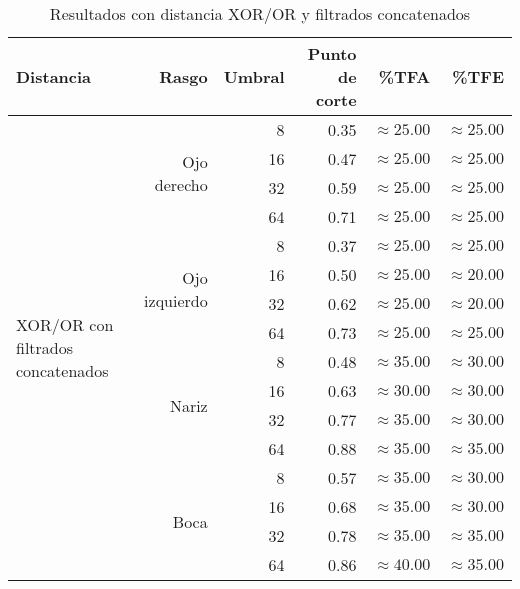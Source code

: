 \begin{table}
\begin{tabular}{|l|r|r|r|r|r|}
 \hline
  Distancia & Rasgo & Umbral & Punto de corte & \%TFA  & \%TFE \\
  \hline \hline
  \multirow{16}{*}{XOR/OR con filtrados concatenados}
& \multirow{4}{*}{Ojo derecho} & 8  & 0.35 & $\approx 25.00$ & $\approx 25.00$ \\
& & 16 & 0.47 & $\approx 25.00$ & $\approx 25.00$ \\
& & 32 & 0.59 & $\approx 25.00$ & $\approx 25.00$ \\
& & 64 & 0.71 & $\approx 25.00$ & $\approx 25.00$ \\ \cline{2-6}

& \multirow{4}{*}{Ojo izquierdo} & 8  & 0.37 & $\approx 25.00$ & $\approx 25.00$ \\
& & 16 & 0.50 & $\approx 25.00$ & $\approx 20.00$ \\
& & 32 & 0.62 & $\approx 25.00$ & $\approx 20.00$ \\
& & 64 & 0.73 & $\approx 25.00$ & $\approx 25.00$ \\ \cline{2-6}

& \multirow{4}{*}{Nariz} & 8  & 0.48 & $\approx 35.00$ & $\approx 30.00$ \\
& & 16 & 0.63 & $\approx 30.00$ & $\approx 30.00$ \\
& & 32 & 0.77 & $\approx 35.00$ & $\approx 30.00$ \\
& & 64 & 0.88 & $\approx 35.00$ & $\approx 35.00$ \\ \cline{2-6}

& \multirow{4}{*}{Boca} & 8  & 0.57 & $\approx 35.00$ & $\approx 30.00$ \\
& & 16 & 0.68 & $\approx 35.00$ & $\approx 30.00$ \\
& & 32 & 0.78 & $\approx 35.00$ & $\approx 35.00$ \\
& & 64 & 0.86 & $\approx 40.00$ & $\approx 35.00$ \\ \hline

 \end{tabular}
 \caption{Resultados con distancia XOR/OR y filtrados concatenados}
 \label{tab:xor_super}
\end{table}
